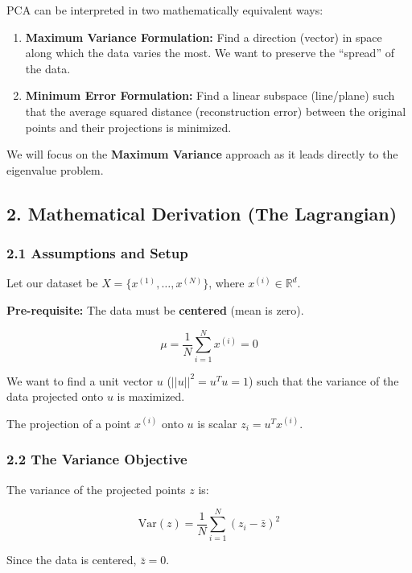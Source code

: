 \documentclass[
  italian,
  11pt,
]{article}
\begin{document}
PCA can be interpreted in two mathematically equivalent ways:

\begin{enumerate}
\def\labelenumi{\arabic{enumi}.}
\item
  \textbf{Maximum Variance Formulation:} Find a direction (vector) in
  space along which the data varies the most. We want to preserve the
  ``spread'' of the data.
\item
  \textbf{Minimum Error Formulation:} Find a linear subspace
  (line/plane) such that the average squared distance (reconstruction
  error) between the original points and their projections is minimized.
\end{enumerate}

We will focus on the \textbf{Maximum Variance} approach as it leads
directly to the eigenvalue problem.

\subsection{2. Mathematical Derivation (The
Lagrangian)}\label{mathematical-derivation-the-lagrangian}

\subsubsection{2.1 Assumptions and Setup}\label{assumptions-and-setup}

Let our dataset be \(X = \{x^{(1)}, \dots, x^{(N)}\}\), where
\(x^{(i)} \in \mathbb{R}^d\).

\textbf{Pre-requisite:} The data must be \textbf{centered} (mean is
zero).

\[\mu = \frac{1}{N} \sum_{i=1}^N x^{(i)} = 0\]

We want to find a unit vector \(u\) (\(||u||^2 = u^T u = 1\)) such that
the variance of the data projected onto \(u\) is maximized.

The projection of a point \(x^{(i)}\) onto \(u\) is scalar
\(z_i = u^T x^{(i)}\).

\subsubsection{2.2 The Variance Objective}\label{the-variance-objective}

The variance of the projected points \(z\) is:

\[\text{Var}(z) = \frac{1}{N} \sum_{i=1}^N (z_i - \bar{z})^2\]

Since the data is centered, \(\bar{z} = 0\).
\end{document}
